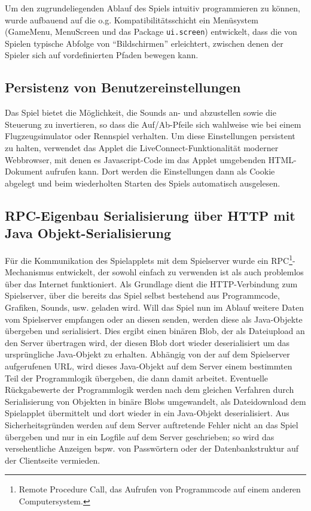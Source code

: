 \documentclass[a4paper,12pt]{scrartcl}
\begin{document}
Um den zugrundeliegenden Ablauf des Spiels intuitiv programmieren zu können, wurde
aufbauend auf die o.g. Kompatibilitätsschicht ein Menüsystem (GameMenu, MenuScreen
und das Package \texttt{ui.screen}) entwickelt, dass die von Spielen typische
Abfolge von "`Bildschirmen"' erleichtert, zwischen denen der Spieler sich auf vordefinierten Pfaden
bewegen kann.

\subsection{Persistenz von Benutzereinstellungen}
Das Spiel bietet die Möglichkeit, die Sounds an- und abzustellen sowie die Steuerung zu
invertieren, so dass die Auf/Ab-Pfeile sich wahlweise wie bei einem Flugzeugsimulator oder
Rennspiel verhalten. Um diese Einstellungen persistent zu halten, verwendet das Applet die
LiveConnect-Funktionalität moderner Webbrowser, mit denen es Javascript-Code im das
Applet umgebenden HTML-Dokument aufrufen kann. Dort werden die Einstellungen dann
als Cookie abgelegt und beim wiederholten Starten des Spiels automatisch ausgelesen.

\subsection{RPC-Eigenbau Serialisierung über HTTP mit Java
Objekt-Serialisierung}
Für die Kommunikation des Spielapplets mit dem
Spielserver wurde ein RPC\footnote{Remote Procedure Call, das Aufrufen von
Programmcode auf einem anderen Computersystem.}-Mecha\-nismus entwickelt, der
sowohl einfach zu verwenden ist als auch problemlos über das Internet funktioniert. Als Grundlage dient die HTTP-Verbindung zum Spielserver, über die bereits
das Spiel selbst bestehend aus Programmcode, Grafiken, Sounds, usw. geladen wird.
Will das Spiel nun im Ablauf weitere Daten vom Spielserver empfangen oder an diesen
senden, werden diese als Java-Objekte übergeben und serialisiert. Dies ergibt einen binären
Blob, der als Dateiupload an den Server übertragen wird, der diesen Blob dort wieder
deserialisiert um das ursprüngliche Java-Objekt zu erhalten. Abhängig von der auf dem
Spielserver aufgerufenen URL, wird dieses Java-Objekt auf dem Server einem bestimmten
Teil der Programmlogik übergeben, die dann damit arbeitet. Eventuelle
Rückgabewerte der Programmlogik werden nach dem gleichen Verfahren durch Serialisierung von Objekten
in binäre Blobs umgewandelt, als Dateidownload dem Spielapplet übermittelt und dort
wieder in ein Java-Objekt deserialisiert. Aus Sicherheitsgründen werden auf dem Server
auftretende Fehler nicht an das Spiel übergeben und nur in ein Logfile auf dem Server
geschrieben; so wird das versehentliche Anzeigen bspw. von Passwörtern oder der
Datenbankstruktur auf der Clientseite vermieden.
\end{document}
